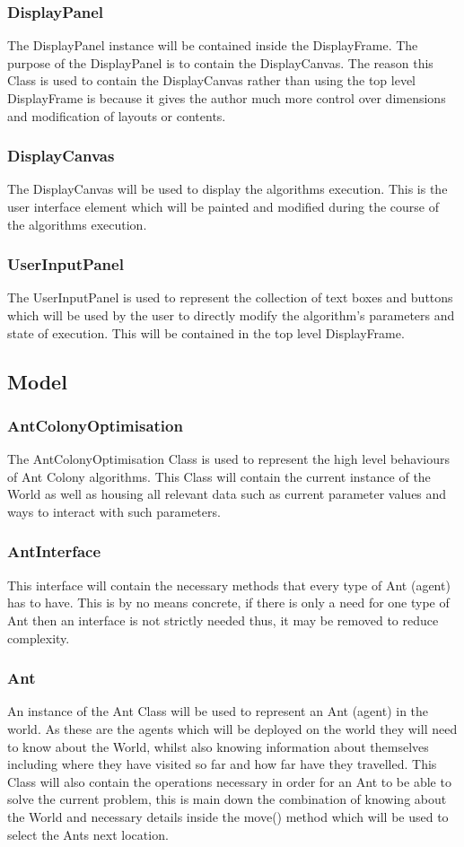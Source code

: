 \subsubsection{DisplayPanel}
The DisplayPanel instance will be contained inside the DisplayFrame. The purpose of the DisplayPanel is to contain the DisplayCanvas. The reason this Class is used to contain the DisplayCanvas rather than using the top level DisplayFrame is because it gives the author much more control over dimensions and modification of layouts or contents.
\subsubsection{DisplayCanvas}
The DisplayCanvas will be used to display the algorithms execution. This is the user interface element which will be painted and modified during the course of the algorithms execution.
\subsubsection{UserInputPanel}
The UserInputPanel is used to represent the collection of text boxes and buttons which will be used by the user to directly modify the algorithm’s parameters and state of execution. This will be contained in the top level DisplayFrame.

\subsection{Model}
\subsubsection{AntColonyOptimisation}
The AntColonyOptimisation Class is used to represent the high level behaviours of Ant Colony algorithms. This Class will contain the current instance of the World as well as housing all relevant data such as current parameter values and ways to interact with such parameters.
\subsubsection{AntInterface}
This interface will contain the necessary methods that every type of Ant (agent) has to have. This is by no means concrete, if there is only a need for one type of Ant then an interface is not strictly needed thus, it may be removed to reduce complexity.
\subsubsection{Ant}
An instance of the Ant Class will be used to represent an Ant (agent) in the world. As these are the agents which will be deployed on the world they will need to know about the World, whilst also knowing information about themselves including where they have visited so far and how far have they travelled. This Class will also contain the operations necessary in order for an Ant to be able to solve the current problem, this is main down the combination of knowing about the World and necessary details inside the move() method which will be used to select the Ants next location.
